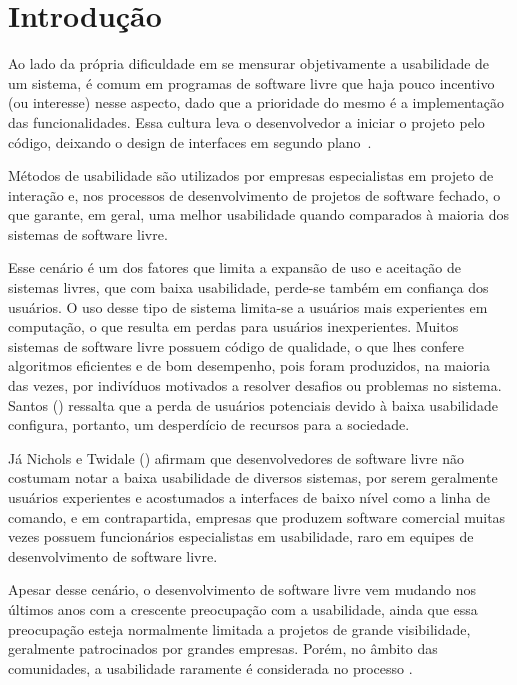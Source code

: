 \chapter{Introdução}
\label{cap-introducao}

Ao lado da própria dificuldade em se mensurar objetivamente a usabilidade de um sistema, é comum em programas de software livre que haja pouco incentivo (ou interesse) nesse aspecto, dado que a prioridade do mesmo é a implementação das funcionalidades. Essa cultura leva o desenvolvedor a iniciar o projeto pelo código, deixando o design de interfaces em segundo plano~\cite{thomas2008}.
%

Métodos de usabilidade são utilizados por empresas especialistas em projeto de interação e, nos processos de desenvolvimento de projetos de software fechado, o que garante, em geral, uma melhor usabilidade quando comparados à maioria dos sistemas de software livre.
%

Esse cenário é um dos fatores que limita a expansão de uso e aceitação de sistemas livres, que com baixa usabilidade, perde-se também em confiança dos usuários. O uso desse tipo de sistema limita-se a usuários mais experientes em computação, o que resulta em perdas para usuários inexperientes. Muitos sistemas de software livre possuem código de qualidade, o que lhes confere algoritmos eficientes e de bom desempenho, pois foram produzidos, na maioria das vezes, por indivíduos motivados a resolver desafios ou problemas no sistema. Santos (\citeyear{santos2012}) ressalta que a perda de usuários potenciais devido à baixa usabilidade configura, portanto, um desperdício de recursos para a sociedade.

%
Já Nichols e Twidale (\citeyear{nichols2006}) afirmam que desenvolvedores de software livre não costumam notar a baixa usabilidade de diversos sistemas, por serem geralmente usuários experientes e acostumados a interfaces de baixo nível como a linha de comando, e em contrapartida, empresas que produzem software comercial muitas vezes possuem funcionários especialistas em usabilidade, raro em equipes de desenvolvimento de software livre.
%

Apesar desse cenário, o desenvolvimento de software livre vem mudando nos últimos anos com a crescente preocupação com a usabilidade, ainda que essa preocupação esteja normalmente limitada a projetos de grande visibilidade, geralmente patrocinados por grandes empresas. Porém, no âmbito das comunidades, a usabilidade raramente é considerada no processo \cite{nichols2006}.

